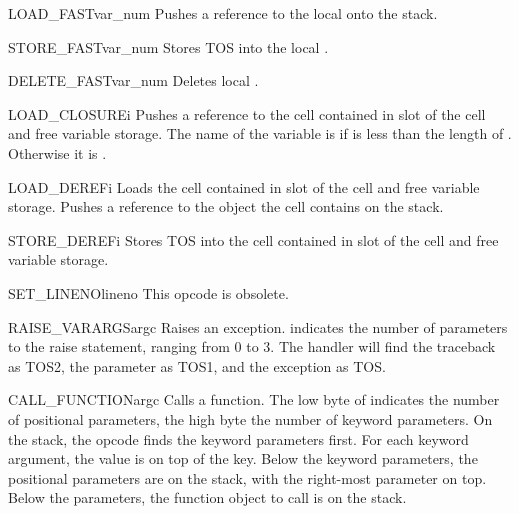 \begin{opcodedesc}{LOAD_FAST}{var_num}
Pushes a reference to the local  onto
the stack.
\end{opcodedesc}

\begin{opcodedesc}{STORE_FAST}{var_num}
Stores TOS into the local .
\end{opcodedesc}

\begin{opcodedesc}{DELETE_FAST}{var_num}
Deletes local .
\end{opcodedesc}

\begin{opcodedesc}{LOAD_CLOSURE}{i}
Pushes a reference to the cell contained in slot  of the
cell and free variable storage.  The name of the variable is 
 if  is less than the length of
.  Otherwise it is 
.
\end{opcodedesc}

\begin{opcodedesc}{LOAD_DEREF}{i}
Loads the cell contained in slot  of the cell and free variable
storage.  Pushes a reference to the object the cell contains on the
stack. 
\end{opcodedesc}

\begin{opcodedesc}{STORE_DEREF}{i}
Stores TOS into the cell contained in slot  of the cell and
free variable storage.
\end{opcodedesc}

\begin{opcodedesc}{SET_LINENO}{lineno}
This opcode is obsolete.
\end{opcodedesc}

\begin{opcodedesc}{RAISE_VARARGS}{argc}
Raises an exception.  indicates the number of parameters
to the raise statement, ranging from 0 to 3.  The handler will find
the traceback as TOS2, the parameter as TOS1, and the exception
as TOS.
\end{opcodedesc}

\begin{opcodedesc}{CALL_FUNCTION}{argc}
Calls a function.  The low byte of  indicates the number of
positional parameters, the high byte the number of keyword parameters.
On the stack, the opcode finds the keyword parameters first.  For each
keyword argument, the value is on top of the key.  Below the keyword
parameters, the positional parameters are on the stack, with the
right-most parameter on top.  Below the parameters, the function object
to call is on the stack.
\end{opcodedesc}

